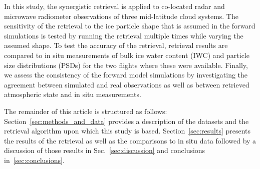 \documentclass[journal abbreviation, manuscript]{copernicus}
\begin{document}


In this study, the synergistic retrieval is applied to co-located radar and
microwave radiometer observations of three mid-latitude cloud systems. The
sensitivity of the retrieval to the ice particle shape that is assumed in the
forward simulations is tested by running the retrieval multiple times while
varying the assumed shape. To test the accuracy of the retrieval, retrieval
results are compared to in situ measurements of bulk ice water content (IWC) and
particle size distributions (PSDs) for the two flights where these were
available. Finally, we assess the consistency of the forward model simulations
by investigating the agreement between simulated and real observations as well
as between retrieved atmospheric state and in situ measurements.

The remainder of this article is structured as follows:
Section~\ref{sec:methods_and_data} provides a description of the datasets and
the retrieval algorithm upon which this study is based.
Section~\ref{sec:results} presents the results of the retrieval as well as the
comparisons to in situ data followed by a discussion of those results in
Sec.~\ref{sec:discussion} and conclusions in~\ref{sec:conclusions}.
\end{document}

